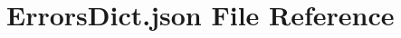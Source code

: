 \hypertarget{_errors_dict_8json}{}\section{Errors\+Dict.\+json File Reference}
\label{_errors_dict_8json}
